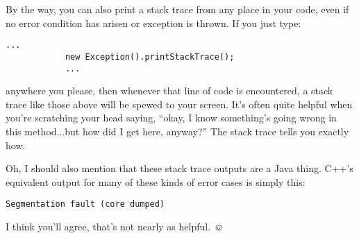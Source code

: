 By the way, you can also print a stack trace from any place in your code, even
if no error condition has arisen or exception is thrown. If you just type:

\begin{Verbatim}[fontsize=\small,samepage=true,frame=single]
            ...
            new Exception().printStackTrace();
            ...
\end{Verbatim}

anywhere you please, then whenever that line of code is encountered, a stack
trace like those above will be spewed to your screen. It's often quite helpful
when you're scratching your head saying, ``okay, I know something's going
wrong in this method...but how did I get here, anyway?'' The stack trace tells
you exactly how.

\bigskip
{}
Oh, I should also mention that these stack trace outputs are a Java thing.
C++'s equivalent output for many of these kinds of error cases is simply this:

\begin{Verbatim}[fontsize=\small,samepage=true,frame=none]
Segmentation fault (core dumped)
\end{Verbatim}

I think you'll agree, that's not nearly as helpful. $\smiley$
